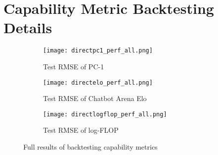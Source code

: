 \section{Capability Metric Backtesting Details}
\label{app:capability_metric_backtesting}

\begin{figure}[!htb]
     \centering
     \begin{subfigure}[b]{0.33\textwidth}
         \centering
        \texttt{[image: directpc1\_perf\_all.png]}
        \caption{Test RMSE of PC-1}
        \label{fig:directpc1_perf_all}
     \end{subfigure}
     \hfill
     \begin{subfigure}[b]{0.33\textwidth}
        \centering
        \texttt{[image: directelo\_perf\_all.png]}
        \caption{Test RMSE of Chatbot Arena Elo}
        \label{fig:directelo_perf_all}
     \end{subfigure}
     \hfill
     \begin{subfigure}[b]{0.33\textwidth}
         \centering
        \texttt{[image: directlogflop\_perf\_all.png]}
        \caption{Test RMSE of log-FLOP    }
        \label{fig:directlogflop_perf_all}
     \end{subfigure}
    \caption{Full results of backtesting capability metrics}
    \label{fig:capability_metric}
\end{figure}
